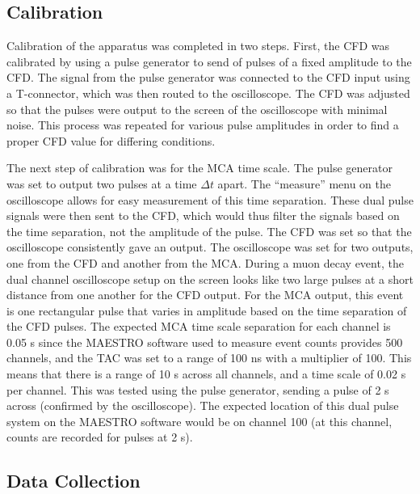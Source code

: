 \documentclass[%
 aip,
 amsmath,amssymb,
 reprint,%
floatfix,
]{revtex4-1}
\begin{document}
\subsection{Calibration}

Calibration of the apparatus was completed in two steps. First, the CFD was calibrated by using a pulse generator to send of pulses of a fixed amplitude to the CFD. The signal from the pulse generator was connected to the CFD input using a T-connector, which was then routed to the oscilloscope. The CFD was adjusted so that the pulses were output to the screen of the oscilloscope with minimal noise. This process was repeated for various pulse amplitudes in order to find a proper CFD value for differing conditions.

The next step of calibration was for the MCA time scale. The pulse generator was set to output two pulses at a time $\Delta t$ apart. The “measure” menu on the oscilloscope allows for easy measurement of this time separation. These dual pulse signals were then sent to the CFD, which would thus filter the signals based on the time separation, not the amplitude of the pulse. The CFD was set so that the oscilloscope consistently gave an output. The oscilloscope was set for two outputs, one from the CFD and another from the MCA. During a muon decay event, the dual channel oscilloscope setup on the screen looks like two large pulses at a short distance from one another for the CFD output. For the MCA output, this event is one rectangular pulse that varies in amplitude based on the time separation of the CFD pulses. The expected MCA time scale separation for each channel is 0.05 \textmu s since the MAESTRO software used to measure event counts provides 500 channels, and the TAC was set to a range of 100 ns with a multiplier of 100. This means that there is a range of 10 \textmu s across all channels, and a time scale of 0.02 \textmu s per channel. This was tested using the pulse generator, sending a pulse of 2 \textmu s across (confirmed by the oscilloscope). The expected location of this dual pulse system on the MAESTRO software would be on channel 100 (at this channel, counts are recorded for pulses at 2 \textmu s).


\subsection{Data Collection}
\end{document}
